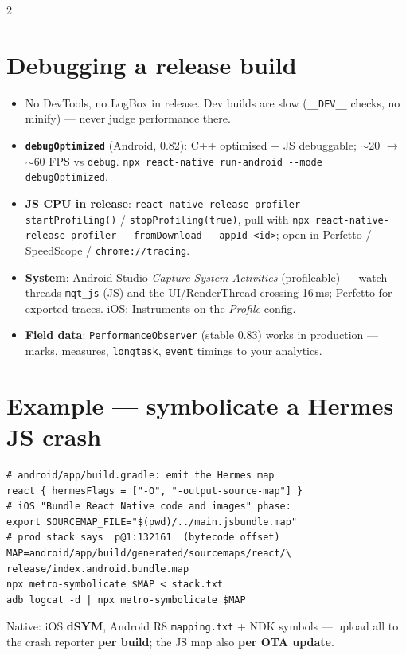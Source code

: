 \documentclass[8pt]{extarticle}
\newcommand\dd{\hbox{-}\hbox{-}}
\newcommand\dsl{\hbox{/}\hbox{/}}
\begin{document}
\begin{multicols}{2}
\section{Debugging a release build}
\begin{itemize}\raggedright
  \item No DevTools, no LogBox in release. Dev builds are slow (\texttt{\_\_DEV\_\_} checks,
        no minify) — never judge performance there.
  \item \textbf{\texttt{debugOptimized}} (Android, 0.82): C++ optimised + JS debuggable;
        $\sim$20 $\to$ $\sim$60 FPS vs \texttt{debug}. \texttt{npx react-native run-android
        \dd{}mode debugOptimized}.
  \item \textbf{JS CPU in release}: \texttt{react-native-release-profiler} —
        \texttt{startProfiling()} / \texttt{stopProfiling(true)}, pull with
        \texttt{npx react-native-release-profiler \dd{}fromDownload \dd{}appId <id>}; open in
        Perfetto / SpeedScope / \texttt{chrome:\dsl{}tracing}.
  \item \textbf{System}: Android Studio \emph{Capture System Activities} (profileable) —
        watch threads \texttt{mqt\_js} (JS) and the UI/RenderThread crossing 16\,ms;
        Perfetto for exported traces. iOS: Instruments on the \emph{Profile} config.
  \item \textbf{Field data}: \texttt{PerformanceObserver} (stable 0.83) works in production —
        marks, measures, \texttt{longtask}, \texttt{event} timings to your analytics.
\end{itemize}

\section{Example — symbolicate a Hermes JS crash}
\begin{lstlisting}[language=ShSheet]
# android/app/build.gradle: emit the Hermes map
react { hermesFlags = ["-O", "-output-source-map"] }
# iOS "Bundle React Native code and images" phase:
export SOURCEMAP_FILE="$(pwd)/../main.jsbundle.map"
# prod stack says  p@1:132161  (bytecode offset)
MAP=android/app/build/generated/sourcemaps/react/\
release/index.android.bundle.map
npx metro-symbolicate $MAP < stack.txt
adb logcat -d | npx metro-symbolicate $MAP
\end{lstlisting}
Native: iOS \textbf{dSYM}, Android R8 \texttt{mapping.txt} + NDK symbols — upload all to the
crash reporter \textbf{per build}; the JS map also \textbf{per OTA update}.


\end{multicols}
\end{document}
